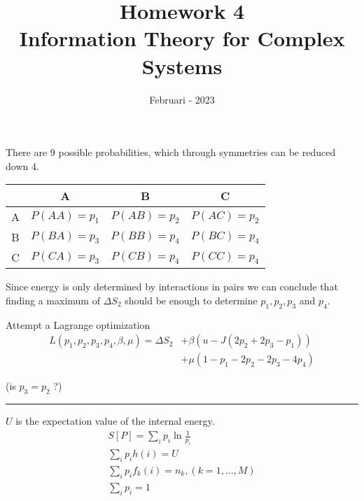 \documentclass[a4paper, 12pt]{article}
\begin{document}
\title{\vspace{-6em}\textbf{Homework 4}\\ \Large Information Theory for Complex Systems \vspace{-3.2em} }
\author{}
\date{Februari - 2023}

\maketitle

There are 9 possible probabilities, which through symmetries can be reduced down 4.
\begin{center}
    \begin{tabular}{c|c|c|c}
         & A & B & C \\ \hline
        A & $P(AA) = p_1$ & $P(AB) = p_2$ & $P(AC) = p_2$ \\ \hline
        B & $P(BA) = p_3$ & $P(BB) = p_4$ & $P(BC) = p_4$ \\ \hline
        C & $P(CA) = p_3$ & $P(CB) = p_4$ & $P(CC) = p_4$ \\
    \end{tabular}
\end{center}
Since energy is only determined by interactions in pairs we can conclude that finding a maximum of $\Delta S_2$ should be enough to determine $p_1,p_2,p_3$ and $p_4$.

Attempt a Lagrange optimization
\begin{equation}
    \begin{split}
        L(p_1, p_2, p_3, p_4, \beta, \mu) = \Delta S_2 & + \beta ( u - J(2p_2 + 2p_3 - p_1))  \\
        & + \mu ( 1 - p_1 - 2 p_2 -  2p_3 - 4 p_4 )
    \end{split}
\end{equation}

(is  $p_3 = p_2$ ?)


\noindent\rule{\textwidth}{0.4pt}

$U$ is the expectation value of the internal energy.
\begin{gather}
    S[P] = \sum_i p_i \ln \frac{1}{p_i} \\
    \sum_i p_i h(i) = U \\
    \sum_i p_i f_k(i) = n_k, (k = 1, \dots , M) \\
    \sum_i p_i = 1
\end{gather}
\end{document}
